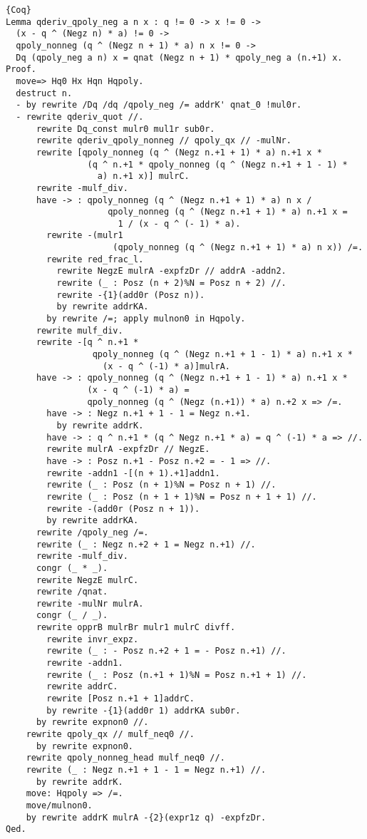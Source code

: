 \documentclass[11pt]{jarticle}
\theoremstyle{mystyle}
\newcommand{\0}{\textbf{0}}
\newcommand{\1}{\textbf{1}}
\newcommand{\2}{\textbf{2}}
\begin{document}
\begin{lstlisting}{Coq}
Lemma qderiv_qpoly_neg a n x : q != 0 -> x != 0 ->
  (x - q ^ (Negz n) * a) != 0 ->
  qpoly_nonneg (q ^ (Negz n + 1) * a) n x != 0 ->
  Dq (qpoly_neg a n) x = qnat (Negz n + 1) * qpoly_neg a (n.+1) x.
Proof.
  move=> Hq0 Hx Hqn Hqpoly.
  destruct n.
  - by rewrite /Dq /dq /qpoly_neg /= addrK' qnat_0 !mul0r.
  - rewrite qderiv_quot //.
      rewrite Dq_const mulr0 mul1r sub0r.
      rewrite qderiv_qpoly_nonneg // qpoly_qx // -mulNr.
      rewrite [qpoly_nonneg (q ^ (Negz n.+1 + 1) * a) n.+1 x *
                (q ^ n.+1 * qpoly_nonneg (q ^ (Negz n.+1 + 1 - 1) *
                  a) n.+1 x)] mulrC.
      rewrite -mulf_div.
      have -> : qpoly_nonneg (q ^ (Negz n.+1 + 1) * a) n x /
                    qpoly_nonneg (q ^ (Negz n.+1 + 1) * a) n.+1 x =
                      1 / (x - q ^ (- 1) * a).
        rewrite -(mulr1
                     (qpoly_nonneg (q ^ (Negz n.+1 + 1) * a) n x)) /=.
        rewrite red_frac_l.
          rewrite NegzE mulrA -expfzDr // addrA -addn2.
          rewrite (_ : Posz (n + 2)%N = Posz n + 2) //.
          rewrite -{1}(add0r (Posz n)).
          by rewrite addrKA.
        by rewrite /=; apply mulnon0 in Hqpoly.
      rewrite mulf_div.
      rewrite -[q ^ n.+1 *
                 qpoly_nonneg (q ^ (Negz n.+1 + 1 - 1) * a) n.+1 x *
                   (x - q ^ (-1) * a)]mulrA.
      have -> : qpoly_nonneg (q ^ (Negz n.+1 + 1 - 1) * a) n.+1 x *
                (x - q ^ (-1) * a) =
                qpoly_nonneg (q ^ (Negz (n.+1)) * a) n.+2 x => /=.
        have -> : Negz n.+1 + 1 - 1 = Negz n.+1.
          by rewrite addrK.
        have -> : q ^ n.+1 * (q ^ Negz n.+1 * a) = q ^ (-1) * a => //.
        rewrite mulrA -expfzDr // NegzE.
        have -> : Posz n.+1 - Posz n.+2 = - 1 => //.
        rewrite -addn1 -[(n + 1).+1]addn1.
        rewrite (_ : Posz (n + 1)%N = Posz n + 1) //.
        rewrite (_ : Posz (n + 1 + 1)%N = Posz n + 1 + 1) //.
        rewrite -(add0r (Posz n + 1)).
        by rewrite addrKA.
      rewrite /qpoly_neg /=.
      rewrite (_ : Negz n.+2 + 1 = Negz n.+1) //.
      rewrite -mulf_div.
      congr (_ * _).
      rewrite NegzE mulrC.
      rewrite /qnat.
      rewrite -mulNr mulrA.
      congr (_ / _).
      rewrite opprB mulrBr mulr1 mulrC divff.
        rewrite invr_expz.
        rewrite (_ : - Posz n.+2 + 1 = - Posz n.+1) //.
        rewrite -addn1.
        rewrite (_ : Posz (n.+1 + 1)%N = Posz n.+1 + 1) //.
        rewrite addrC.
        rewrite [Posz n.+1 + 1]addrC.
        by rewrite -{1}(add0r 1) addrKA sub0r.
      by rewrite expnon0 //.
    rewrite qpoly_qx // mulf_neq0 //.
      by rewrite expnon0.
    rewrite qpoly_nonneg_head mulf_neq0 //.
    rewrite (_ : Negz n.+1 + 1 - 1 = Negz n.+1) //.
      by rewrite addrK.
    move: Hqpoly => /=.
    move/mulnon0.
    by rewrite addrK mulrA -{2}(expr1z q) -expfzDr.
Qed.
\end{lstlisting}
\end{document}
